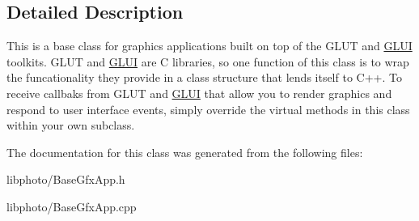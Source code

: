 \subsection{Detailed Description}
This is a base class for graphics applications built on top of the G\-L\-U\-T and \hyperlink{classGLUI}{G\-L\-U\-I} toolkits. G\-L\-U\-T and \hyperlink{classGLUI}{G\-L\-U\-I} are C libraries, so one function of this class is to wrap the funcationality they provide in a class structure that lends itself to C++. To receive callbaks from G\-L\-U\-T and \hyperlink{classGLUI}{G\-L\-U\-I} that allow you to render graphics and respond to user interface events, simply override the virtual methods in this class within your own subclass. 

The documentation for this class was generated from the following files\-:\begin{DoxyCompactItemize}
\item 
libphoto/Base\-Gfx\-App.\-h\item 
libphoto/Base\-Gfx\-App.\-cpp\end{DoxyCompactItemize}
